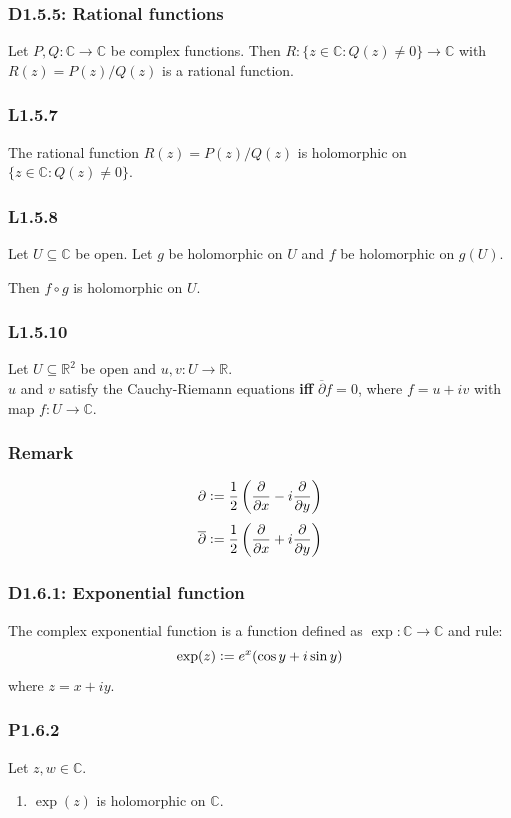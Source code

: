 \documentclass{article}
\newcommand{\deq}{\vcentcolon=}
\begin{document}
\begin{multicols*}{3}
\subsubsection*{D1.5.5: Rational functions}
Let $P,Q:\mathbb{C}\rightarrow\mathbb{C}$ be complex functions.
Then $R:\{z\in\mathbb{C}:Q(z)\neq0\}\rightarrow\mathbb{C}$
with $R(z)=P(z)/Q(z)$ is a rational function.

\subsubsection*{L1.5.7}
The rational function $R(z)=P(z)/Q(z)$
is holomorphic on $\{z\in\mathbb{C}:Q(z)\neq0\}$.

\subsubsection*{L1.5.8}
Let $U\subseteq\mathbb{C}$ be open.
Let $g$ be holomorphic on $U$ and $f$ be holomorphic on $g(U)$.

Then $f\circ g$ is holomorphic on $U$.

\subsubsection*{L1.5.10}
Let $U\subseteq\mathbb{R}^2$ be open
and $u,v:U\rightarrow\mathbb{R}$. \\
$u$ and $v$ satisfy the Cauchy-Riemann equations
\textbf{if{}f} $\overline{\partial}f=0$, where
$f=u+iv$ with map $f:U\rightarrow\mathbb{C}$.

\subsubsection*{Remark}
$$\partial\deq\frac{1}{2}\left(\frac{\partial}{\partial x}
-i\frac{\partial}{\partial y}\right)$$
$$\overline{\partial}\deq\frac{1}{2}\left(\frac{\partial}{\partial x}
+i\frac{\partial}{\partial y}\right)$$

\subsubsection*{D1.6.1: Exponential function}
The complex exponential function is a function defined as
$\exp:\mathbb{C}\rightarrow\mathbb{C}$ and rule:
$$\exp(z)\deq e^x(\cos y+i\sin y)$$
where $z=x+iy$.

\subsubsection*{P1.6.2}
Let $z,w\in\mathbb{C}$.
\begin{enumerate}
    \item $\exp(z)$ is holomorphic on $\mathbb{C}$.
    

\end{enumerate}
\end{multicols*}
\end{document}
